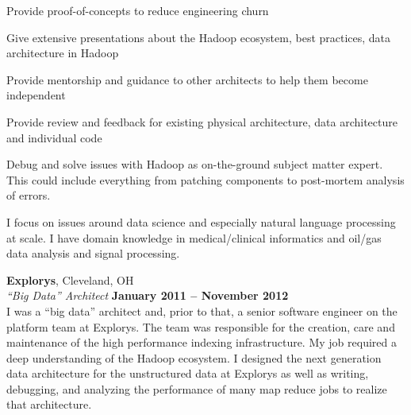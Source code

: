 \documentclass[margin,line,12pt]{resume}
\begin{document}
\begin{resume}
    \begin{list2}
    \item  Provide proof-of-concepts to reduce engineering churn
    \item  Give extensive presentations about the Hadoop ecosystem, best practices, data architecture in Hadoop
    \item  Provide mentorship and guidance to other architects to help them become independent
    \item  Provide review and feedback for existing physical architecture, data architecture and individual code
    \item  Debug and solve issues with Hadoop as on-the-ground subject matter expert.  This could include everything from patching components to post-mortem analysis of errors.
    \end{list2}

    I focus on issues around data science and especially natural language processing at scale. I have domain knowledge in medical/clinical informatics and oil/gas data analysis and signal processing.

    \textbf{Explorys}, Cleveland, OH \vspace{2mm}\\\vspace{1mm}%
    \textsl{``Big Data'' Architect} \hfill \textbf{January 2011 -- November 2012}\\
    I was a ``big data'' architect and, prior to that, a senior software engineer on the platform team at Explorys. 
    The team was responsible for the creation, care and maintenance of the high performance indexing infrastructure.
    My job required a deep understanding of the Hadoop ecosystem.  I designed the next generation data 
    architecture for the unstructured data at Explorys as well as writing, debugging, and analyzing the 
    performance of many map reduce jobs to realize that architecture.  


\end{resume}
\end{document}
